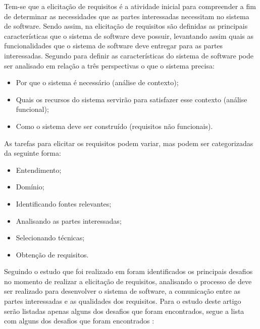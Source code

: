 \documentclass[a4paper,twoside]{article}
\begin{document}
Tem-se que a elicitação de requisitos é a atividade inicial para compreender a fim de determinar as necessidades que as partes interessadas necessitam no sistema de software. Sendo assim, na elicitação de requisitos são definidas as principais características que o sistema de software deve possuir, levantando assim quais as funcionalidades que o sistema de software deve entregar para as partes interessadas. Segundo \cite{DBLP:conf/sac/PereiraPPMC21} para definir as características do sistema de software pode ser analisado em relação a três perspectivas o que o sistema precisa:
\begin{itemize}
    \item Por que o sistema é necessário (análise de contexto);
    \item Quais os recursos do sistema servirão para satisfazer esse contexto (análise funcional);
    \item Como o sistema deve ser construído (requisitos não funcionais).
\end{itemize}

As tarefas para elicitar os requisitos podem variar, mas podem ser categorizadas da seguinte forma:
\begin{itemize}
    \item Entendimento;
    \item Domínio;
    \item Identificando fontes relevantes;
    \item Analisando as partes interessadas;
    \item Selecionando técnicas;
    \item Obtenção de requisitos.
\end{itemize}

Seguindo o estudo que foi realizado em \cite{DBLP:conf/sac/PereiraPPMC21} foram identificados os principais desafios no momento de realizar a elicitação de requisitos, analisando o processo de deve ser realizado para desenvolver o sistema de software,  a comunicação entre as partes interessadas e as qualidades dos requisitos. Para o estudo deste artigo serão listadas apenas alguns dos desafios que foram encontrados, segue a lista com alguns dos desafios que foram encontrados \cite{DBLP:conf/sac/PereiraPPMC21}:
\end{document}
